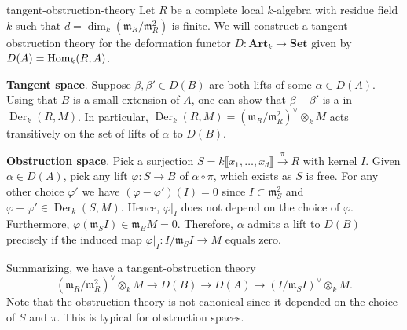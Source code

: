 \begin{example}{tangent-obstruction-theory}
    Let $R$ be a complete local $k$-algebra with residue field $k$ such that $d = \dim_k(\mathfrak{m}_R/\mathfrak{m}_R^2)$ is finite. We will construct a tangent-obstruction theory for the deformation functor $D \colon \textbf{Art}_k \to \textbf{Set}$ given by $D(A) = \operatorname{Hom}_k(R, A)$.

    \textbf{Tangent space}. Suppose $\beta, \beta' \in D(B)$ are both lifts of some $\alpha \in D(A)$. Using that $B$ is a small extension of $A$, one can show that $\beta - \beta'$ is a  in $\operatorname{Der}_k(R, M)$. In particular, $\operatorname{Der}_k(R, M) = (\mathfrak{m}_R/\mathfrak{m}_R^2)^\vee \otimes_k M$ acts transitively on the set of lifts of $\alpha$ to $D(B)$.

    \textbf{Obstruction space}. Pick a surjection $S = k\llbracket x_1, \ldots, x_d \rrbracket \xrightarrow{\pi} R$ with kernel $I$. Given $\alpha \in D(A)$, pick any lift $\varphi \colon S \to B$ of $\alpha \circ \pi$, which exists as $S$ is free. For any other choice $\varphi'$ we have $(\varphi - \varphi')(I) = 0$ since $I \subset \mathfrak{m}_S^2$ and $\varphi - \varphi' \in \operatorname{Der}_k(S, M)$. Hence, $\varphi|_I$ does not depend on the choice of $\varphi$. Furthermore, $\varphi(\mathfrak{m}_S I) \in \mathfrak{m}_B M = 0$. Therefore, $\alpha$ admits a lift to $D(B)$ precisely if the induced map $\varphi|_I \colon I / \mathfrak{m}_S I \to M$ equals zero.

    Summarizing, we have a tangent-obstruction theory
    \[ (\mathfrak{m}_R/\mathfrak{m}_R^2)^\vee \otimes_k M \to D(B) \to D(A) \to (I/\mathfrak{m}_S I)^\vee \otimes_k M . \]
    Note that the obstruction theory is not canonical since it depended on the choice of $S$ and $\pi$. This is typical for obstruction spaces.
\end{example}

